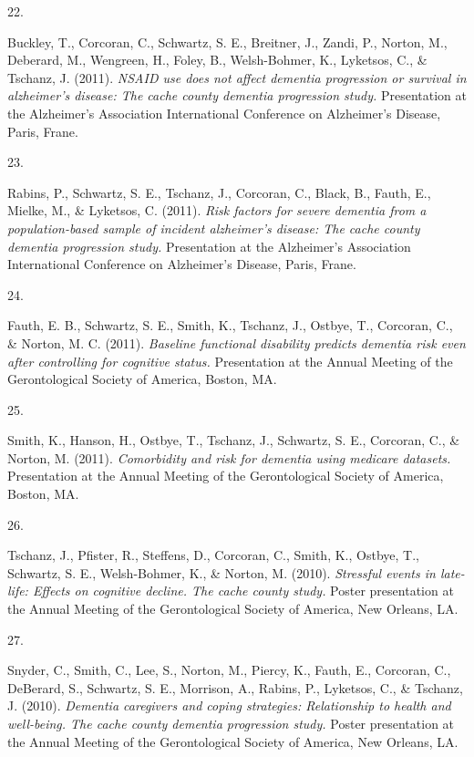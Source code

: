 \documentclass[11pt,a4paper,]{moderncv}
\newlength{\csllabelwidth}
\newcommand{\CSLLeftMargin}[1]{\parbox[t]{\csllabelwidth}{#1}}
\newcommand{\CSLRightInline}[1]{\parbox[t]{\linewidth - \csllabelwidth}{#1}}
\begin{document}
\leavevmode\hypertarget{ref-buckley2011pres}{}%
\CSLLeftMargin{22. }
\CSLRightInline{Buckley, T., Corcoran, C., Schwartz, S. E., Breitner,
J., Zandi, P., Norton, M., Deberard, M., Wengreen, H., Foley, B.,
Welsh-Bohmer, K., Lyketsos, C., \& Tschanz, J. (2011). \emph{NSAID use
does not affect dementia progression or survival in alzheimer's disease:
The cache county dementia progression study.} Presentation at the
Alzheimer's Association International Conference on Alzheimer's Disease,
Paris, Frane.}

\leavevmode\hypertarget{ref-rabins2011pres}{}%
\CSLLeftMargin{23. }
\CSLRightInline{Rabins, P., Schwartz, S. E., Tschanz, J., Corcoran, C.,
Black, B., Fauth, E., Mielke, M., \& Lyketsos, C. (2011). \emph{Risk
factors for severe dementia from a population-based sample of incident
alzheimer's disease: The cache county dementia progression study.}
Presentation at the Alzheimer's Association International Conference on
Alzheimer's Disease, Paris, Frane.}

\leavevmode\hypertarget{ref-fauth2011pres}{}%
\CSLLeftMargin{24. }
\CSLRightInline{Fauth, E. B., Schwartz, S. E., Smith, K., Tschanz, J.,
Ostbye, T., Corcoran, C., \& Norton, M. C. (2011). \emph{Baseline
functional disability predicts dementia risk even after controlling for
cognitive status.} Presentation at the Annual Meeting of the
Gerontological Society of America, Boston, MA.}

\leavevmode\hypertarget{ref-smith2011pres}{}%
\CSLLeftMargin{25. }
\CSLRightInline{Smith, K., Hanson, H., Ostbye, T., Tschanz, J.,
Schwartz, S. E., Corcoran, C., \& Norton, M. (2011). \emph{Comorbidity
and risk for dementia using medicare datasets.} Presentation at the
Annual Meeting of the Gerontological Society of America, Boston, MA.}

\leavevmode\hypertarget{ref-joann2010pres}{}%
\CSLLeftMargin{26. }
\CSLRightInline{Tschanz, J., Pfister, R., Steffens, D., Corcoran, C.,
Smith, K., Ostbye, T., Schwartz, S. E., Welsh-Bohmer, K., \& Norton, M.
(2010). \emph{Stressful events in late-life: Effects on cognitive
decline. The cache county study.} Poster presentation at the Annual
Meeting of the Gerontological Society of America, New Orleans, LA.}

\leavevmode\hypertarget{ref-snyder2010pres}{}%
\CSLLeftMargin{27. }
\CSLRightInline{Snyder, C., Smith, C., Lee, S., Norton, M., Piercy, K.,
Fauth, E., Corcoran, C., DeBerard, S., Schwartz, S. E., Morrison, A.,
Rabins, P., Lyketsos, C., \& Tschanz, J. (2010). \emph{Dementia
caregivers and coping strategies: Relationship to health and well-being.
The cache county dementia progression study.} Poster presentation at the
Annual Meeting of the Gerontological Society of America, New Orleans,
LA.}
\end{document}
